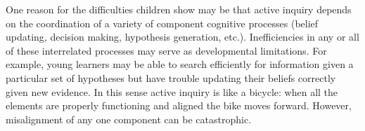 \documentclass[man,floatsintext]{apa6}
\begin{document}
One reason for the difficulties children show may be that 
active inquiry depends on the coordination of a variety of 
component cognitive processes (belief updating, decision making, hypothesis generation, etc.).  
Inefficiencies in any or all of these interrelated processes may serve as developmental limitations.  
For example, young learners may be able to search efficiently for information given a particular 
set of hypotheses but have trouble updating their beliefs correctly given new evidence.
In this sense active inquiry is like a bicycle: when all the elements are properly functioning
and aligned the bike moves forward.  
However, misalignment of any one component can be catastrophic.



\end{document}
